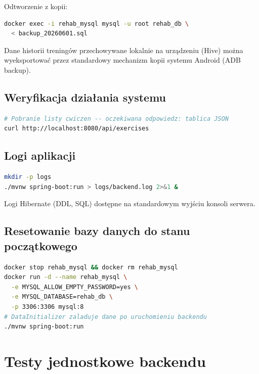 \documentclass[12pt,a4paper]{article}
\begin{document}
Odtworzenie z kopii:
\begin{lstlisting}[language=bash, caption={Odtworzenie bazy z kopii zapasowej}]
docker exec -i rehab_mysql mysql -u root rehab_db \
  < backup_20260601.sql
\end{lstlisting}

Dane historii treningów przechowywane lokalnie na urządzeniu (Hive) można wyeksportować przez standardowy mechanizm kopii systemu Android (ADB backup).

\subsection{Weryfikacja działania systemu}

\begin{lstlisting}[language=bash, caption={Weryfikacja działania API}]
# Pobranie listy cwiczen -- oczekiwana odpowiedz: tablica JSON
curl http://localhost:8080/api/exercises
\end{lstlisting}

\subsection{Logi aplikacji}

\begin{lstlisting}[language=bash, caption={Uruchomienie backendu z zapisem logów}]
mkdir -p logs
./mvnw spring-boot:run > logs/backend.log 2>&1 &
\end{lstlisting}

Logi Hibernate (DDL, SQL) dostępne na standardowym wyjściu konsoli serwera.

\subsection{Resetowanie bazy danych do stanu początkowego}

\begin{lstlisting}[language=bash, caption={Reset bazy danych}]
docker stop rehab_mysql && docker rm rehab_mysql
docker run -d --name rehab_mysql \
  -e MYSQL_ALLOW_EMPTY_PASSWORD=yes \
  -e MYSQL_DATABASE=rehab_db \
  -p 3306:3306 mysql:8
# DataInitializer zaladuje dane po uruchomieniu backendu
./mvnw spring-boot:run
\end{lstlisting}

\section{Testy jednostkowe backendu}
\end{document}
